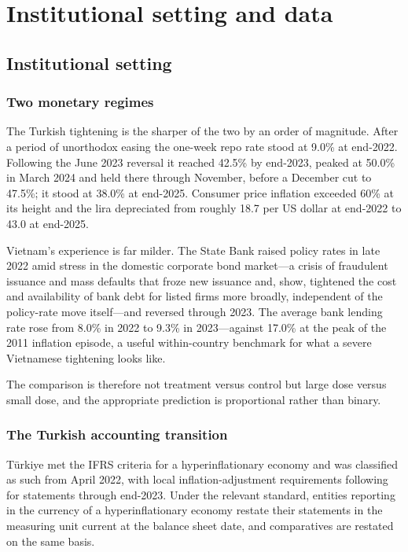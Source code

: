 \documentclass[review,12pt,authoryear]{elsarticle}
\theoremstyle{plain}
\theoremstyle{definition}
\begin{document}
\section{Institutional setting and data}
\label{sec:data}

\subsection{Institutional setting}
\label{sec:setting}


\subsubsection{Two monetary regimes}

The Turkish tightening is the sharper of the two by an order of magnitude.
After a period of unorthodox easing the one-week repo rate stood at 9.0\% at
end-2022. Following the June 2023 reversal it reached 42.5\% by end-2023, peaked
at 50.0\% in March 2024 and held there through November, before a December cut
to 47.5\%; it stood at 38.0\% at end-2025. Consumer price inflation
exceeded 60\% at its height and the lira depreciated from roughly 18.7 per US
dollar at end-2022 to 43.0 at end-2025.

Vietnam's experience is far milder. The State Bank raised policy rates in late
2022 amid stress in the domestic corporate bond market---a crisis of fraudulent
issuance and mass defaults that froze new issuance and, \citet{huynhphan2024}
show, tightened the cost and availability of bank debt for listed firms more
broadly, independent of the policy-rate move itself---and reversed through
2023. The average bank lending rate rose from 8.0\% in 2022 to 9.3\% in
2023---against 17.0\% at the peak of the 2011 inflation episode, a useful
within-country benchmark for what a severe Vietnamese tightening looks like.

The comparison is therefore not treatment versus control but large dose versus
small dose, and the appropriate prediction is proportional rather than binary.

\subsubsection{The Turkish accounting transition}

T\"{u}rkiye met the IFRS criteria for a hyperinflationary economy and was
classified as such from April 2022, with local inflation-adjustment
requirements following for statements through end-2023. Under the relevant
standard, entities reporting in the currency of a hyperinflationary economy
restate their statements in the measuring unit current at the balance sheet
date, and comparatives are restated on the same basis.
\end{document}
